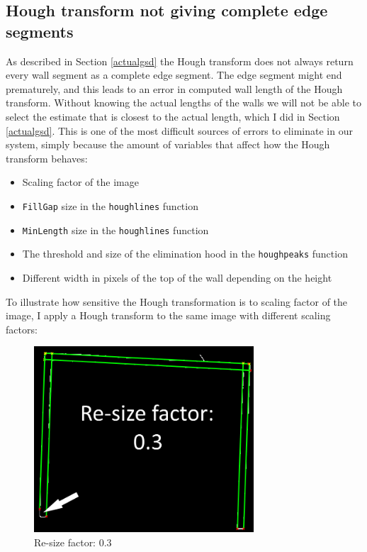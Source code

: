 \subsection{Hough transform not giving complete edge segments}
As described in Section \ref{actualgsd} the Hough transform does not always return every wall segment as a complete edge segment. The edge segment might end prematurely, and this leads to an error in computed wall length of the Hough transform. Without knowing the actual lengths of the walls we will not be able to select the estimate that is closest to the actual length, which I did in Section \ref{actualgsd}. This is one of the most difficult sources of errors to eliminate in our system, simply because the amount of variables that affect how the Hough transform behaves:
\begin{itemize}
\item Scaling factor of the image
\item \texttt{FillGap} size in the \texttt{houghlines} function
\item \texttt{MinLength} size in the \texttt{houghlines} function
\item The threshold and size of the elimination hood in the \texttt{houghpeaks} function
\item Different width in pixels of the top of the wall depending on the height
\end{itemize}
To illustrate how sensitive the Hough transformation is to scaling factor of the image, I apply a Hough transform to the same image with different scaling factors:
\begin{figure}[H]
\centering
\includegraphics[width=0.73\textwidth]{fig/resize1}
  \caption{Re-size factor: 0.3}
  \label{fig:resize1}
\end{figure}
